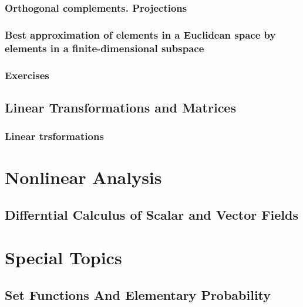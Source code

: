 \documentclass[cn,11pt,chinese]{elegantbook}
\numberwithin{equation}{section}
\begin{document}
\section{Orthogonal complements. Projections}


\section{Best approximation of elements in a Euclidean space by elements in a finite-dimensional subspace}


\section{Exercises}


\chapter{Linear Transformations and Matrices}
\section{Linear trsformations}




\part{Nonlinear Analysis}
\chapter{Differntial Calculus of Scalar and Vector Fields}





\part{Special Topics}
\chapter{Set Functions And Elementary Probability}







% 

\appendix
\end{document}
